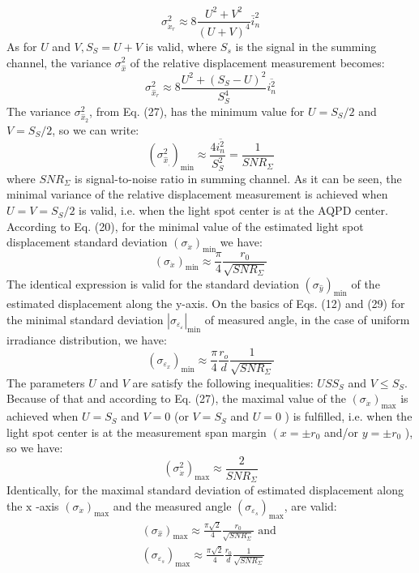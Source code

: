 \documentclass[10pt]{article}
\begin{document}
\[
\sigma_{\dot{x}_{r}}^{2} \approx 8 \frac{U^{2}+V^{2}}{(U+V)^{4}} \bar{i}_{n}^{2}
\]
As for \(U\) and \(V, S_{S}=U+V\) is valid, where \(S_{s}\) is the signal in the summing channel, the variance \(\sigma_{\hat{x}}^{2}\) of the relative displacement measurement becomes:
\[
\sigma_{\hat{x}_{r}}^{2} \approx 8 \frac{U^{2}+\left(S_{S}-U\right)^{2}}{S_{S}^{4}} \overline{i_{n}^{2}}
\]
The variance \(\sigma_{\hat{x}_{2}}^{2}\), from Eq. (27), has the minimum value for \(U=S_{S} / 2\) and \(V=S_{S} / 2\), so we can write:
\[
\left(\sigma_{\hat{x}_{,}}^{2}\right)_{\min } \approx \frac{4 \overline{i_{n}^{2}}}{S_{S}^{2}}=\frac{1}{S N R_{\Sigma}}
\]
where \(S N R_{\Sigma}\) is signal-to-noise ratio in summing channel. As it can be seen, the minimal variance of the relative displacement measurement is achieved when \(U=V=S_{S} / 2\) is valid, i.e. when the light spot center is at the AQPD center. According to Eq. (20), for the minimal value of the estimated light spot displacement standard deviation \(\left(\sigma_{\dot{x}}\right)_{\min }\) we have:
\[
\left(\sigma_{\dot{x}}\right)_{\min } \approx \frac{\pi}{4} \frac{r_{0}}{\sqrt{S N R_{\Sigma}}}
\]
The identical expression is valid for the standard deviation \(\left(\sigma_{\hat{y}}\right)_{\min }\) of the estimated displacement along the y-axis. On the basics of Eqs. (12) and (29) for the minimal standard deviation \(\left|\sigma_{\varepsilon_{\varepsilon}}\right|_{\min }\) of measured angle, in the case of uniform irradiance distribution, we have:
\[
\left(\sigma_{\varepsilon_{x}}\right)_{\min } \approx \frac{\pi}{4} \frac{r_{o}}{d} \frac{1}{\sqrt{S N R_{\Sigma}}}
\]
The parameters \(U\) and \(V\) are satisfy the following inequalities: \(U S S_{S}\) and \(V \leq S_{S} .\) Because of that and according to Eq. (27), the maximal value of the \(\left(\sigma_{\dot{x}}\right)_{\max }\) is achieved when \(U=S_{S}\) and \(V=0\) (or \(V=S_{S}\) and \(U=0\) ) is fulfilled, i.e. when the light spot center is at the measurement span margin \(\left(x=\pm r_{0}\right.\) and/or \(y=\pm r_{0}\) ), so we have:
\[
\left(\sigma_{\dot{x}}^{2}\right)_{\max } \approx \frac{2}{S N R_{\Sigma}}
\]
Identically, for the maximal standard deviation of estimated displacement along the \(\mathrm{x}\) -axis \(\left(\sigma_{\dot{x}}\right)_{\max }\) and the measured angle \(\left(\sigma_{\varepsilon_{s}}\right)_{\max }\), are valid:
\[
\begin{array}{l}
\left(\sigma_{\hat{x}}\right)_{\max } \approx \frac{\pi \sqrt{2}}{4} \frac{r_{0}}{\sqrt{S N R_{\Sigma}}} \text { and } \\
\left(\sigma_{\varepsilon_{s}}\right)_{\max } \approx \frac{\pi \sqrt{2}}{4} \frac{r_{0}}{d} \frac{1}{\sqrt{S N R_{\Sigma}}}
\end{array}
\]
\end{document}
